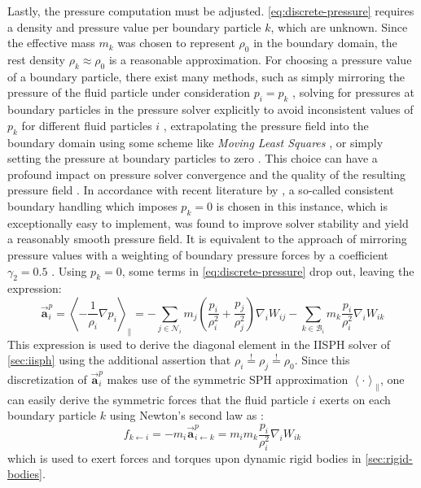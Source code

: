 \documentclass[oneside, a4paper]{book}
\newcommand\angled[1]{\left\langle#1\right\rangle}
\newcommand\vek[1]{\vec{\bm{#1}}}
\newcommand\br[1]{\left(#1\right)}
\begin{document}
    Lastly, the pressure computation must be adjusted. \autoref{eq:discrete-pressure} requires a density and pressure value per boundary particle $k$, which are unknown. Since the effective mass $m_k$ was chosen to represent $\rho_0$ in the boundary domain, the rest density $\rho_k\approx\rho_0$ is a reasonable approximation. For choosing a pressure value of a boundary particle, there exist many methods, such as simply mirroring the pressure of the fluid particle under consideration $p_i=p_k$ \autocite{versatile-boundary-akinci}, solving for pressures at boundary particles in the pressure solver explicitly to avoid inconsistent values of $p_k$ for different fluid particles $i$ \autocite{pressure-boundaries}{}, extrapolating the pressure field into the boundary domain using some scheme like \textit{Moving Least Squares} \autocite{mls-pressure-extrapolation}, or simply setting the pressure at boundary particles to zero \autocite{consistent-boundaries}. This choice can have a profound impact on pressure solver convergence and the quality of the resulting pressure field \autocite{consistent-boundaries}. In accordance with recent literature by \autocite[Bender et al.]{consistent-boundaries}, a so-called consistent boundary handling which imposes $p_k=0$ is chosen in this instance, which is exceptionally easy to implement, was found to improve solver stability and yield a reasonably smooth pressure field. It is equivalent to the approach of mirroring pressure values with a weighting of boundary pressure forces by a coefficient $\gamma_2=0.5$ \autocite{tutorial2019}. Using $p_k=0$, some terms in \autoref{eq:discrete-pressure} drop out, leaving the expression:
    \begin{equation}\label{eq:discrete-pressure-bdy}
      \vek{a}_i^p = \angled{-\frac{1}{\rho_i}\nabla p_i}_\parallel 
      = -\sum_{j\in\mathcal{N}_i} m_j \br{\frac{p_i}{\rho_i^2} + \frac{p_j}{\rho_j^2}} \nabla_iW_{ij} -\sum_{k\in\mathcal{B}_i} m_k\frac{p_i}{\rho_i^2} \nabla_iW_{ik}
    \end{equation}
    This expression is used to derive the diagonal element in the IISPH solver of \autoref{sec:iisph} using the additional assertion that $\rho_i\overset{!}{=}\rho_j\overset{!}{=}\rho_0$. Since this discretization of $\vek{a}_i^p$ makes use of the symmetric SPH approximation $\angled{\cdot}_\parallel$, one can easily derive the symmetric forces that the fluid particle $i$ exerts on each boundary particle $k$ using Newton's second law as \autocite{versatile-boundary-akinci}:
    \begin{equation}\label{force-on-bdy}
      f_{k\leftarrow i} = - m_i \vek{a}_{i\leftarrow k}^p = m_i m_k\frac{p_i}{\rho_i^2} \nabla_iW_{ik}
    \end{equation}
    which is used to exert forces and torques upon dynamic rigid bodies in \autoref{sec:rigid-bodies}.
\end{document}
